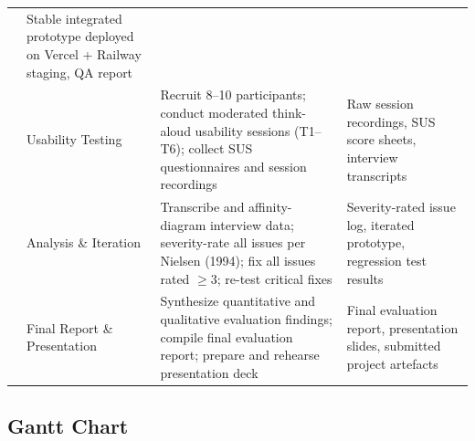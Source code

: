 \documentclass[14pt]{article}
\begin{document}
{\begin{longtable}{@{}>{\centering\arraybackslash}p{} p{} p{} p{}@{}}
  & Stable integrated prototype deployed on Vercel + Railway staging, QA report \\
8
  & Usability Testing
  & Recruit 8--10 participants; conduct moderated think-aloud usability sessions (T1--T6); collect SUS questionnaires and session recordings
  & Raw session recordings, SUS score sheets, interview transcripts \\
9
  & Analysis \& Iteration
  & Transcribe and affinity-diagram interview data; severity-rate all issues per Nielsen (1994); fix all issues rated $\geq 3$; re-test critical fixes
  & Severity-rated issue log, iterated prototype, regression test results \\
10
  & Final Report \& Presentation
  & Synthesize quantitative and qualitative evaluation findings; compile final evaluation report; prepare and rehearse presentation deck
  & Final evaluation report, presentation slides, submitted project artefacts \\
\end{longtable}
}

\subsection*{Gantt Chart}

\end{document}
